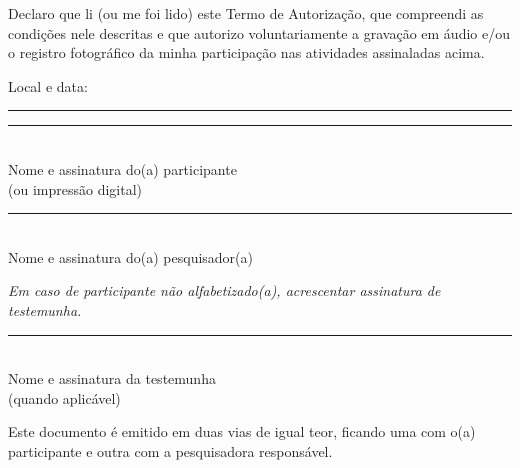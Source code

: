 \documentclass[12pt,a4paper,brazil]{article}
\begin{document}
Declaro que li (ou me foi lido) este Termo de Autorização, que compreendi as condições nele descritas e que autorizo voluntariamente a gravação em áudio e/ou o registro fotográfico da minha participação nas atividades assinaladas acima.

\vspace{1.5cm}

\noindent
\begin{minipage}[t]{0.55\textwidth}
Local e data:\\[1.5cm]
\rule{8cm}{0.4pt}
\end{minipage}

\vspace{1cm}

\noindent
\begin{minipage}[t]{0.48\textwidth}
\centering
\rule{7cm}{0.4pt}\\
Nome e assinatura do(a) participante\\
(ou impressão digital)
\end{minipage}
\hfill
\begin{minipage}[t]{0.48\textwidth}
\centering
\rule{7cm}{0.4pt}\\
Nome e assinatura do(a) pesquisador(a)
\end{minipage}

\vspace{1.5cm}

\noindent
\textit{Em caso de participante não alfabetizado(a), acrescentar assinatura de testemunha.}

\vspace{1cm}

\noindent
\begin{minipage}[t]{0.48\textwidth}
\centering
\rule{7cm}{0.4pt}\\
Nome e assinatura da testemunha\\
(quando aplicável)
\end{minipage}

\vspace{1cm}

\noindent
\footnotesize{Este documento é emitido em duas vias de igual teor, ficando uma com o(a) participante e outra com a pesquisadora responsável.}
\end{document}
